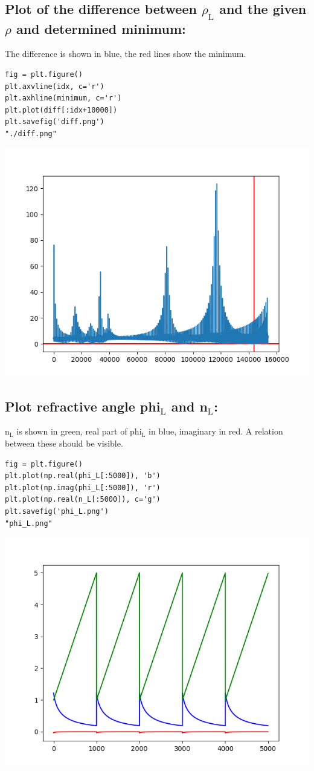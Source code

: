 \documentclass[11pt]{article}
\begin{document}
\subsection{Plot of the difference between \(\rho_{\text{L}}\) and the given \(\rho\) and determined minimum:}
\label{sec:orgfecaadc}

The difference is shown in blue, the red lines show the minimum.

\begin{verbatim}
fig = plt.figure()
plt.axvline(idx, c='r')
plt.axhline(minimum, c='r')
plt.plot(diff[:idx+10000])
plt.savefig('diff.png')
"./diff.png"
\end{verbatim}

\begin{center}
\includegraphics[width=.9\linewidth]{./diff.png}
\end{center}

\subsection{Plot refractive angle phi\(_{\text{L}}\) and n\(_{\text{L}}\):}
\label{sec:org6ab251a}

n\(_{\text{L}}\) is shown in green, real part of phi\(_{\text{L}}\) in blue, imaginary in red. 
A relation between these should be visible.

\begin{verbatim}
fig = plt.figure()
plt.plot(np.real(phi_L[:5000]), 'b')
plt.plot(np.imag(phi_L[:5000]), 'r')
plt.plot(np.real(n_L[:5000]), c='g')
plt.savefig('phi_L.png')
"phi_L.png"
\end{verbatim}

\begin{center}
\includegraphics[width=.9\linewidth]{phi_L.png}
\end{center}


\end{document}
